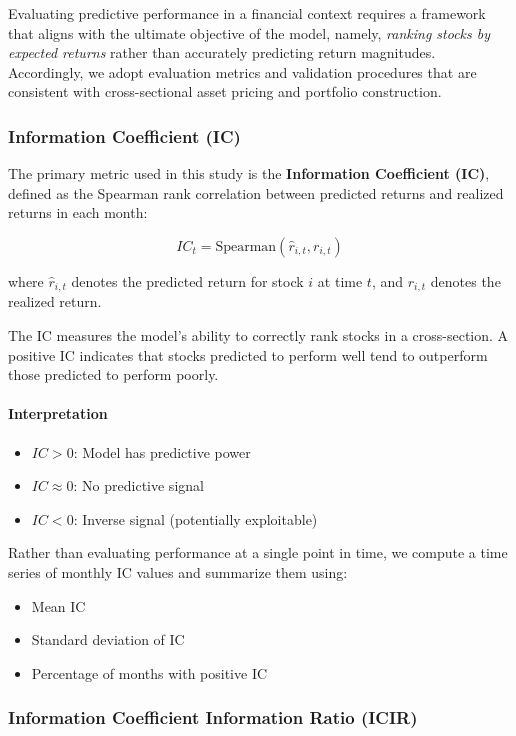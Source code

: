 \documentclass[11pt]{article}
\begin{document}
Evaluating predictive performance in a financial context requires a framework that aligns with the ultimate objective of the model, namely, \textit{ranking stocks by expected returns} rather than accurately predicting return magnitudes. Accordingly, we adopt evaluation metrics and validation procedures that are consistent with cross-sectional asset pricing and portfolio construction.

\subsubsection{Information Coefficient (IC)}

The primary metric used in this study is the \textbf{Information Coefficient (IC)}, defined as the Spearman rank correlation between predicted returns and realized returns in each month:

\[
IC_t = \text{Spearman}(\hat{r}_{i,t}, r_{i,t})
\]

where $\hat{r}_{i,t}$ denotes the predicted return for stock $i$ at time $t$, and $r_{i,t}$ denotes the realized return.

The IC measures the model's ability to correctly rank stocks in a cross-section. A positive IC indicates that stocks predicted to perform well tend to outperform those predicted to perform poorly.

\paragraph{Interpretation}
\begin{itemize}
    \item $IC > 0$: Model has predictive power
    \item $IC \approx 0$: No predictive signal
    \item $IC < 0$: Inverse signal (potentially exploitable)
\end{itemize}

Rather than evaluating performance at a single point in time, we compute a time series of monthly IC values and summarize them using:
\begin{itemize}
    \item Mean IC
    \item Standard deviation of IC
    \item Percentage of months with positive IC
\end{itemize}

\subsubsection{Information Coefficient Information Ratio (ICIR)}
\end{document}
